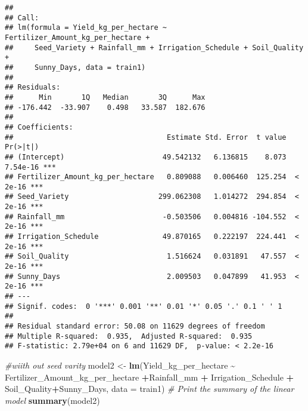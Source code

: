 \documentclass[
]{article}
\newenvironment{Shaded}{\begin{snugshade}}{\end{snugshade}}
\newcommand{\AttributeTok}[1]{\textcolor[rgb]{0.13,0.29,0.53}{#1}}
\newcommand{\CommentTok}[1]{\textcolor[rgb]{0.56,0.35,0.01}{\textit{#1}}}
\newcommand{\FunctionTok}[1]{\textcolor[rgb]{0.13,0.29,0.53}{\textbf{#1}}}
\newcommand{\NormalTok}[1]{#1}
\newcommand{\OtherTok}[1]{\textcolor[rgb]{0.56,0.35,0.01}{#1}}
\newcommand{\SpecialCharTok}[1]{\textcolor[rgb]{0.81,0.36,0.00}{\textbf{#1}}}
\begin{document}
\begin{verbatim}
## 
## Call:
## lm(formula = Yield_kg_per_hectare ~ Fertilizer_Amount_kg_per_hectare + 
##     Seed_Variety + Rainfall_mm + Irrigation_Schedule + Soil_Quality + 
##     Sunny_Days, data = train1)
## 
## Residuals:
##      Min       1Q   Median       3Q      Max 
## -176.442  -33.907    0.498   33.587  182.676 
## 
## Coefficients:
##                                    Estimate Std. Error  t value Pr(>|t|)    
## (Intercept)                       49.542132   6.136815    8.073 7.54e-16 ***
## Fertilizer_Amount_kg_per_hectare   0.809088   0.006460  125.254  < 2e-16 ***
## Seed_Variety                     299.062308   1.014272  294.854  < 2e-16 ***
## Rainfall_mm                       -0.503506   0.004816 -104.552  < 2e-16 ***
## Irrigation_Schedule               49.870165   0.222197  224.441  < 2e-16 ***
## Soil_Quality                       1.516624   0.031891   47.557  < 2e-16 ***
## Sunny_Days                         2.009503   0.047899   41.953  < 2e-16 ***
## ---
## Signif. codes:  0 '***' 0.001 '**' 0.01 '*' 0.05 '.' 0.1 ' ' 1
## 
## Residual standard error: 50.08 on 11629 degrees of freedom
## Multiple R-squared:  0.935,  Adjusted R-squared:  0.935 
## F-statistic: 2.79e+04 on 6 and 11629 DF,  p-value: < 2.2e-16
\end{verbatim}

\begin{Shaded}
\begin{Highlighting}[]
\CommentTok{\#wiith out seed varity}
\NormalTok{model2 }\OtherTok{\textless{}{-}} \FunctionTok{lm}\NormalTok{(Yield\_kg\_per\_hectare }\SpecialCharTok{\textasciitilde{}}\NormalTok{ Fertilizer\_Amount\_kg\_per\_hectare }\SpecialCharTok{+}\NormalTok{Rainfall\_mm }\SpecialCharTok{+}\NormalTok{ Irrigation\_Schedule }\SpecialCharTok{+}\NormalTok{ Soil\_Quality}\SpecialCharTok{+}\NormalTok{Sunny\_Days, }\AttributeTok{data =}\NormalTok{ train1)}
\CommentTok{\# Print the summary of the linear model}
\FunctionTok{summary}\NormalTok{(model2)}
\end{Highlighting}
\end{Shaded}
\end{document}
